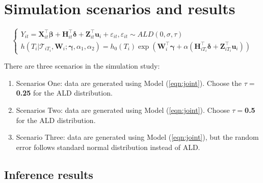 \documentclass{article}
\begin{document}
\section{Simulation scenarios and results}

\begin{equation}\label{eqn:joint}
\left\{
\begin{array}{l}
Y_{it} = {\boldsymbol X}_{it}^{\top}\boldsymbol{\beta} + {\boldsymbol H}_{it}^{\top}\boldsymbol{\delta} + {\boldsymbol Z}_{it}^{\top}{\boldsymbol u}_i + \varepsilon_{it}, \varepsilon_{it}\sim ALD(0, \sigma,\tau)\\
h(T_i|\mathcal{T}_{iT_i}, {\boldsymbol W}_i;  \boldsymbol{\gamma}, \alpha_1,
\alpha_2) = h_0(T_i)\exp({\boldsymbol W}_i^{\top}\boldsymbol{\gamma} + \alpha({\boldsymbol H}_{iT_i}^{\top}\boldsymbol{\delta} + {\boldsymbol Z}_{iT_i}^{\top}{\boldsymbol u}_{i}))
\end{array}
\right.
\end{equation}


There are three scenarios in the simulation study:
\begin{enumerate}
\item Scenarios One: data are generated using Model (\ref{eqn:joint}). Choose the $\tau=$ {\bf 0.25} for the ALD distribution.
\item Scenarios Two: data are generated using Model (\ref{eqn:joint}). Choose $\tau= ${\bf 0.5} for the ALD distribution.
\item Scenario Three: data are generated using Model (\ref{eqn:joint}), but the random error follows standard normal distribution instead of ALD.
\end{enumerate}

\subsection{Inference results}
\end{document}
